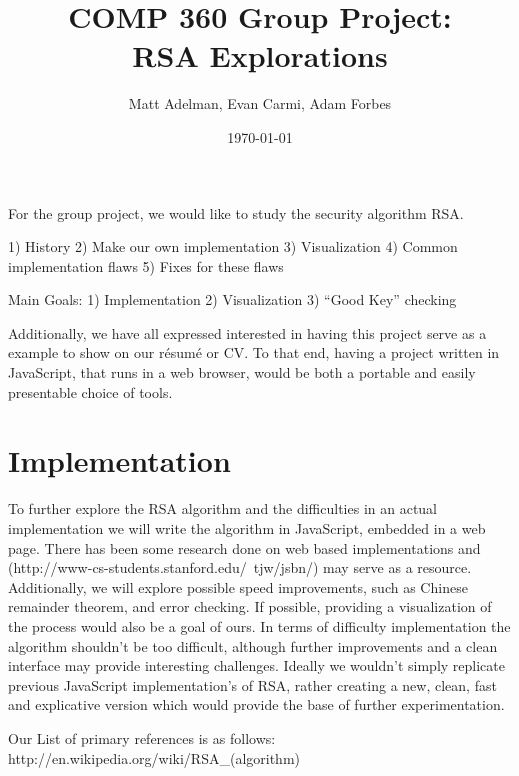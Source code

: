 \documentclass[12pt]{article}
\title{COMP 360 Group Project:\\RSA Explorations}
\author{Matt Adelman, Evan Carmi, Adam Forbes}
\date{\today}
\begin{document}
\maketitle

For the group project, we would like to study the security algorithm RSA. 

1) History
2) Make our own implementation
3) Visualization
4) Common implementation flaws
5) Fixes for these flaws

Main Goals:
1) Implementation
2) Visualization
3) ``Good Key'' checking


Additionally, we have all expressed interested in having this project serve as a example to show on our résumé or CV. To that end, having a project written in JavaScript, that runs in a web browser, would be both a portable and easily presentable choice of tools.

\bigbreak

\section{Implementation}
To further explore the RSA algorithm and the difficulties in an actual implementation we will write the algorithm in JavaScript, embedded in a web page. There has been some research done on web based implementations and (http://www-cs-students.stanford.edu/~tjw/jsbn/) may serve as a resource. Additionally, we will explore possible speed improvements, such as Chinese remainder theorem, and error checking. If possible, providing a visualization of the process would also be a goal of ours. In terms of difficulty implementation the algorithm shouldn't be too difficult, although further improvements and a clean interface may provide interesting challenges. Ideally we wouldn't simply replicate previous JavaScript implementation's of RSA, rather creating a new, clean, fast and explicative version which would provide the base of further experimentation.




Our List of primary references is as follows:
http://en.wikipedia.org/wiki/RSA\_(algorithm)
\end{document}
